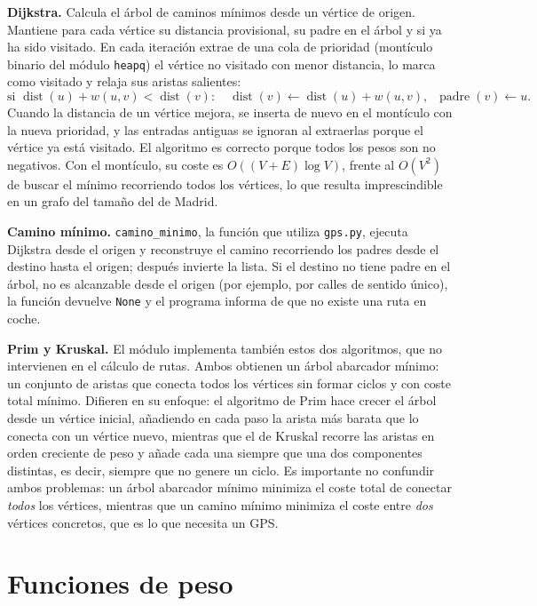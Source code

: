 \documentclass[11pt,a4paper]{article}
\newcommand{\code}[1]{\texttt{#1}}
\begin{document}
\textbf{Dijkstra.} Calcula el árbol de caminos mínimos desde un vértice de origen. Mantiene para cada vértice su distancia provisional, su padre en el árbol y si ya ha sido visitado. En cada iteración extrae de una cola de prioridad (montículo binario del módulo \code{heapq}) el vértice no visitado con menor distancia, lo marca como visitado y relaja sus aristas salientes:
\[
\text{si } \operatorname{dist}(u)+w(u,v)<\operatorname{dist}(v):\quad \operatorname{dist}(v)\leftarrow\operatorname{dist}(u)+w(u,v),\;\; \operatorname{padre}(v)\leftarrow u .
\]
Cuando la distancia de un vértice mejora, se inserta de nuevo en el montículo con la nueva prioridad, y las entradas antiguas se ignoran al extraerlas porque el vértice ya está visitado. El algoritmo es correcto porque todos los pesos son no negativos. Con el montículo, su coste es $O((V+E)\log V)$, frente al $O(V^2)$ de buscar el mínimo recorriendo todos los vértices, lo que resulta imprescindible en un grafo del tamaño del de Madrid.

\textbf{Camino mínimo.} \code{camino\_minimo}, la función que utiliza \code{gps.py}, ejecuta Dijkstra desde el origen y reconstruye el camino recorriendo los padres desde el destino hasta el origen; después invierte la lista. Si el destino no tiene padre en el árbol, no es alcanzable desde el origen (por ejemplo, por calles de sentido único), la función devuelve \code{None} y el programa informa de que no existe una ruta en coche.

\textbf{Prim y Kruskal.} El módulo implementa también estos dos algoritmos, que no intervienen en el cálculo de rutas. Ambos obtienen un árbol abarcador mínimo: un conjunto de aristas que conecta todos los vértices sin formar ciclos y con coste total mínimo. Difieren en su enfoque: el algoritmo de Prim hace crecer el árbol desde un vértice inicial, añadiendo en cada paso la arista más barata que lo conecta con un vértice nuevo, mientras que el de Kruskal recorre las aristas en orden creciente de peso y añade cada una siempre que una dos componentes distintas, es decir, siempre que no genere un ciclo. Es importante no confundir ambos problemas: un árbol abarcador mínimo minimiza el coste total de conectar \emph{todos} los vértices, mientras que un camino mínimo minimiza el coste entre \emph{dos} vértices concretos, que es lo que necesita un GPS.

\section{Funciones de peso}
\end{document}
